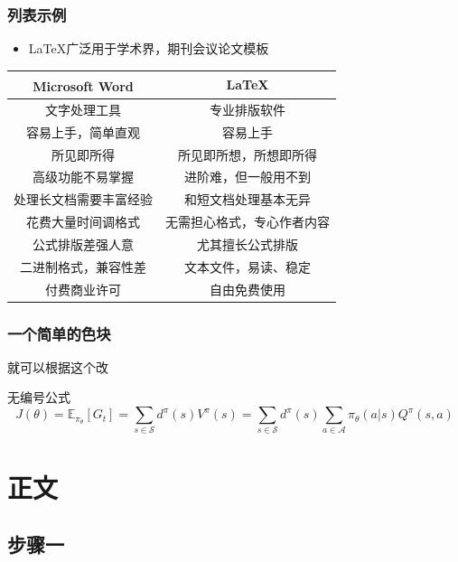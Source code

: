 \documentclass[AutoFakeBold,AutoFakeSlant]{beamer}
\begin{document}
\begin{frame}
  \frametitle{列表示例}
\begin{itemize}
	\item \LaTeX 广泛用于学术界，期刊会议论文模板
\end{itemize}
\begin{table}[h]
	\centering
	\begin{tabular}{c|c}
		Microsoft\textsuperscript{\textregistered}  Word & \LaTeX \\
		\hline
		文字处理工具 & 专业排版软件 \\
		容易上手，简单直观 & 容易上手 \\
		所见即所得 & 所见即所想，所想即所得 \\
		高级功能不易掌握 & 进阶难，但一般用不到 \\
		处理长文档需要丰富经验 & 和短文档处理基本无异 \\
		花费大量时间调格式 & 无需担心格式，专心作者内容 \\
		公式排版差强人意 & 尤其擅长公式排版 \\
		二进制格式，兼容性差 & 文本文件，易读、稳定 \\
		付费商业许可 & 自由免费使用 \\
	\end{tabular}
\end{table}
\end{frame}

\begin{frame}
  \frametitle{一个简单的色块}
  就可以根据这个改
 \begin{exampleblock}{无编号公式} %
	\begin{equation*}
		J(\theta) = \mathbb{E}_{\pi_\theta}[G_t] = \sum_{s\in\mathcal{S}} d^\pi (s)V^\pi(s)=\sum_{s\in\mathcal{S}} d^\pi(s)\sum_{a\in\mathcal{A}}\pi_\theta(a|s)Q^\pi(s,a)
	\end{equation*}
\end{exampleblock}
\end{frame}


\section{正文}

\subsection{步骤一}
\end{document}
